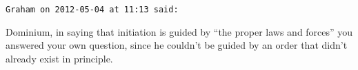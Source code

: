 \begin{footnotesize}
\begin{sffamily}
\hfill

\texttt{Graham on 2012-05-04 at 11:13 said:}

Dominium, in saying that initiation is guided by ``the proper laws and forces'' you answered your own question, since he couldn't be guided by an order that didn't already exist in principle.

\hfill

\end{sffamily}
\end{footnotesize}

